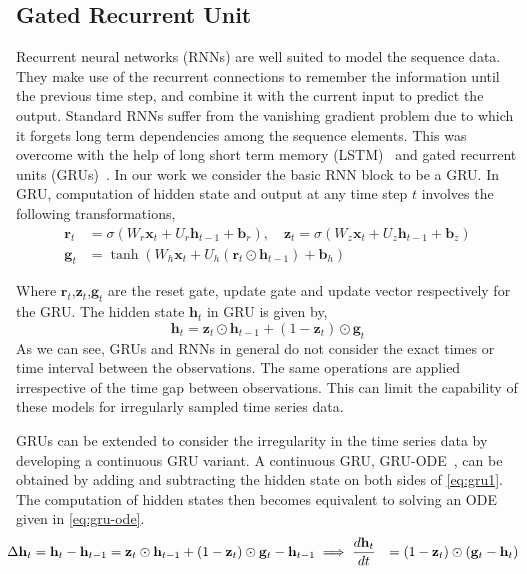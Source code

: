 \documentclass{article} %
\newcommand{\bx}{\mathbf{x}}
\newcommand{\bz}{\mathbf{z}}
\newcommand{\bg}{\mathbf{g}}
\newcommand{\bh}{\mathbf{h}}
\newcommand{\bb}{\mathbf{b}}
\newcommand{\br}{\mathbf{r}}
\begin{document}
\subsection{Gated Recurrent Unit}
Recurrent neural  networks (RNNs) are well suited to model the sequence data. They make use of the recurrent connections to remember the information until the previous time step, and combine it with the current input to predict the output. Standard RNNs suffer from the vanishing gradient problem due to which it forgets long term dependencies among the sequence elements. This was overcome with the help of long short term memory (LSTM)~\citep{lstm} and gated recurrent units (GRUs)~\citep{gru}. In our work we consider the basic RNN  block to be a  GRU. In GRU, computation of  hidden state and output at any time step $t$ involves the following transformations,
\begin{equation}
    \begin{aligned}
    \br_t &= \sigma(W_r\bx_t + U_r\bh_{t-1} + \bb_r)  , \quad 
    \bz_t = \sigma(W_z\bx_t + U_z\bh_{t-1} + \bb_z) \\
    \bg_t &= \tanh(W_h\bx_t + U_h(\br_t \odot \bh_{t-1}) + \bb_h) 
    \label{eq:gru}
    \end{aligned}
\end{equation}

Where $\br_t$,$\bz_t$,$\bg_t$ are the reset gate, update gate and update vector respectively for the GRU. The  hidden state $\bh_t$ in GRU is given by,
\begin{equation}
    \bh_t = \bz_t \odot \bh_{t-1}  + (1-\bz_t)\odot\bg_t
    \label{eq:gru1}
\end{equation}
As we can see, GRUs and RNNs in general do not consider the exact times or time interval between the observations. The same operations are applied irrespective of the  time gap between observations. This can limit the capability of these models for irregularly sampled time series data.  

GRUs can be extended to consider the irregularity in the time series data by developing a continuous GRU variant. A continuous GRU, GRU-ODE~\citep{de2019gru}, can be obtained by adding and  subtracting the hidden state on both sides of \eqref{eq:gru1}. The  computation of hidden states then becomes equivalent to solving an ODE given in \eqref{eq:gru-ode}. 
\begin{equation}\hspace{-3mm}
    \begin{aligned}
    \Delta\bh_t &= \bh_t - \bh_{t-1}= \bz_t \odot \bh_{t-1}  + (1-\bz_t)\odot\bg_t - \bh_{t-1} 
    \implies \frac{d\bh_t}{dt} &= (1-\bz_{t}) \odot (\bg_{t} - \bh_{t})
    \label{eq:gru-ode}
    \end{aligned}
\end{equation}
\end{document}
